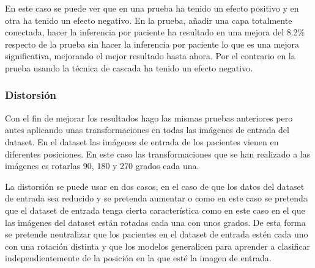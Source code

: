 \documentclass[12pt,a4paper]{article}
\begin{document}
En este caso se puede ver que en una prueba ha tenido un efecto positivo y en otra ha tenido un efecto negativo. En la prueba, añadir una capa totalmente conectada, hacer la inferencia por paciente ha resultado en una mejora del 8.2\% respecto de la prueba sin hacer la inferencia por paciente lo que es una mejora significativa, mejorando el mejor resultado hasta ahora. Por el contrario en la prueba usando la técnica de cascada ha tenido un efecto negativo.

\subsubsection{Distorsión}
Con el fin de mejorar los resultados hago las mismas pruebas anteriores pero antes aplicando unas transformaciones en todas las imágenes de entrada del dataset. En el dataset las imágenes de entrada de los pacientes vienen en diferentes posiciones. En este caso las transformaciones que se han realizado a las imágenes es rotarlas 90, 180 y 270 grados cada una.
\bigskip

La distorsión se puede usar en dos casos, en el caso de que los datos del dataset de entrada sea reducido y se pretenda aumentar o como en este caso se pretenda que el dataset de entrada tenga cierta característica como en este caso en el que las imágenes del dataset están rotadas cada una con unos grados. De esta forma se pretende neutralizar que los pacientes en el dataset de entrada estén cada uno con una rotación distinta y que los modelos generalicen para aprender a clasificar independientemente de la posición en la que esté la imagen de entrada.
\end{document}

